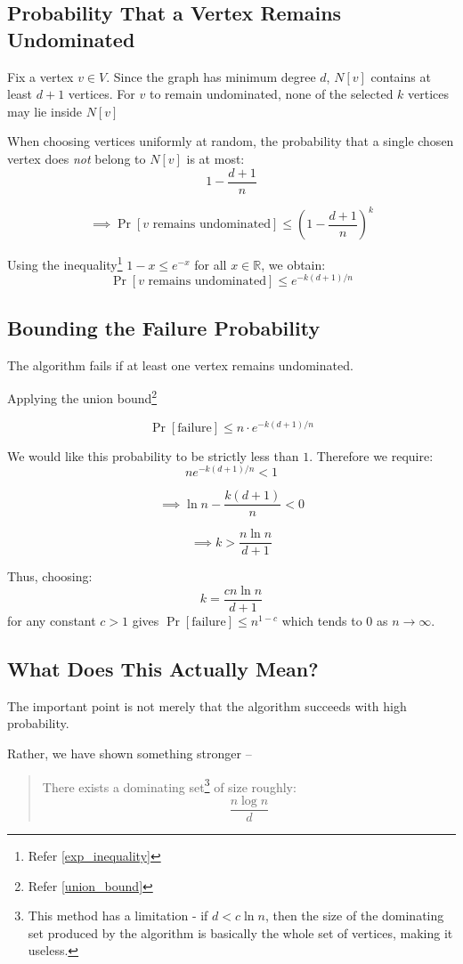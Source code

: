 \documentclass[11pt,openany]{book}
\begin{document}
\subsection*{Probability That a Vertex Remains Undominated}

Fix a vertex $v\in V$. Since the graph has minimum degree \(d\), $N[v]$ contains 
at least $d+1$ vertices. For \(v\) to remain undominated, none of the selected \(k\) 
vertices may lie inside $N[v]$

When choosing vertices uniformly at random, the probability that a single chosen vertex does \emph{not} belong to \(N[v]\) is at most:
\[
1-\frac{d+1}{n}
\]

\[
\implies
\Pr[v\text{ remains undominated}]
\le
\left(1-\frac{d+1}{n}\right)^k
\]

Using the inequality\footnote{Refer \autoref{exp_inequality}} $1-x\le e^{-x}$ for all $x\in\mathbb{R}$, we obtain:
\[
\Pr[v\text{ remains undominated}]
\le
e^{-k(d+1)/n}
\]

\subsection*{Bounding the Failure Probability}

The algorithm fails if at least one vertex remains undominated.

Applying the union bound\footnote{Refer \autoref{union_bound}}

\[
\Pr[\text{failure}]
\le
n\cdot e^{-k(d+1)/n}
\]

We would like this probability to be strictly less than \(1\). Therefore we require:
\[
n e^{-k(d+1)/n}<1
\]

\[
\implies
\ln n-\frac{k(d+1)}{n}<0
\]

\[
\implies
k>\frac{n\ln n}{d+1}
\]

Thus, choosing:
\[
k=\frac{cn\ln n}{d+1}
\]
for any constant $c>1$ gives 
$
\Pr[\text{failure}]
\le
n^{1-c}
$ which tends to \(0\) as \(n\to\infty\).

\subsection*{What Does This Actually Mean?}

The important point is not merely that the algorithm succeeds with high probability.

Rather, we have shown something stronger --

\begin{quote}
There exists a dominating set\footnote{
This method has a limitation - if $d<c\ln n$, 
then the size of the dominating set produced by the algorithm is basically the whole set of vertices, making it useless.} of size roughly:
\[
\frac{n\log n}{d}
\]
\end{quote}
\end{document}
